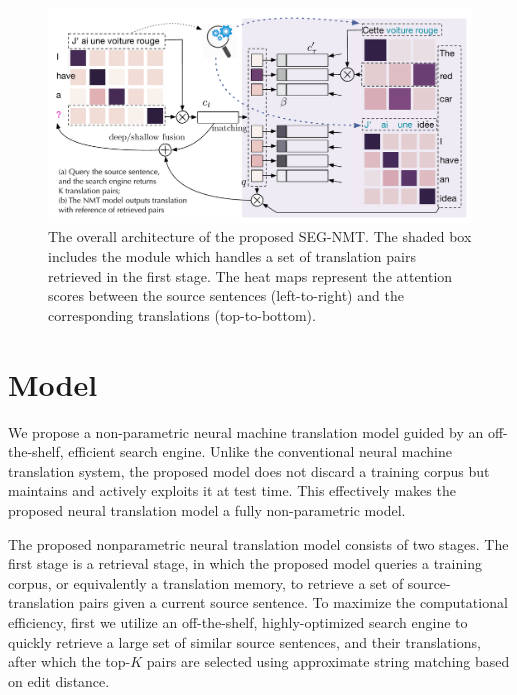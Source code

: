 \begin{figure}[hptb]
\centering
\includegraphics[width=\linewidth]{figs/seg/framework2.pdf}
\caption{\label{cp4.fig.tmnmt} The overall architecture of the proposed SEG-NMT. The shaded box includes the module which handles a set of translation pairs retrieved in the first stage. The heat maps represent the attention scores between the source sentences (left-to-right) and the corresponding translations (top-to-bottom).}
\end{figure}


\section{Model}

We propose a non-parametric
neural machine translation model guided by an off-the-shelf, efficient search engine. Unlike the conventional neural machine translation system, the proposed model does not discard a training corpus but maintains and actively exploits it at test time. This effectively makes the proposed neural translation model a fully non-parametric model.

The proposed nonparametric
neural translation model consists of two stages. The first stage is a retrieval stage, in which the proposed model queries a training corpus, or equivalently a translation memory, to retrieve a set of source-translation pairs given a current source sentence. To maximize the computational efficiency, first we utilize an off-the-shelf, highly-optimized search engine to quickly retrieve a large set of similar source sentences, and their translations, after which the top-$K$ pairs are selected using approximate string matching based on edit distance. 

